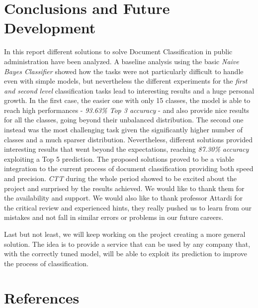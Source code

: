 \documentclass[12pt]{article}
\begin{document}
\section{Conclusions and Future Development}
In this report different solutions to solve Document Classification in public administration have been analyzed. A baseline analysis using the basic \textit{Naive Bayes Classifier} showed how the tasks were not particularly difficult to handle even with simple models, but nevertheless the different experiments for the \textit{first and second level} classification tasks lead to interesting results and a huge personal growth. In the first case, the easier one with only 15 classes, the model is able to reach high performances - \textit{93.63\% Top 3 accuracy} - and also provide nice results for all the classes, going beyond their unbalanced distribution. The second one instead was the most challenging task given the significantly higher number of classes and a much sparser distribution. Nevertheless, different solutions provided interesting results that went beyond the expectations, reaching \textit{87.30\% accuracy} exploiting a Top 5 prediction. The proposed solutions proved to be a viable integration to the current process of document classification providing both speed and precision. 
\textit{CTT} during the whole period showed to be excited about the project and surprised by the results achieved. We would like to thank them for the availability and support. We would also like to thank professor Attardi for the critical review and experienced hints, they really pushed us to learn from our mistakes and not fall in similar errors or problems in our future careers.

Last but not least, we will keep working on the project creating a more general solution. The idea is to provide a service that can be used by any company that, with the correctly tuned model, will be able to exploit its prediction to improve the process of classification.

\newpage
\section{References}
\printbibliography[heading=none]

\newpage
\end{document}
